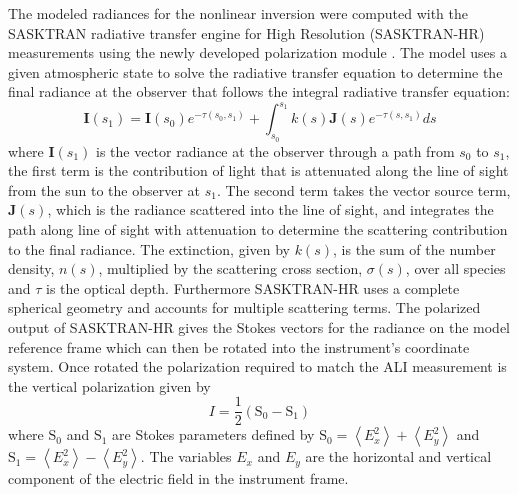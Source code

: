\documentclass[12pt]{article}
\begin{document}
The modeled radiances for the nonlinear inversion were computed with the SASKTRAN radiative transfer engine \citep{Bourassa2008a} for High Resolution (SASKTRAN-HR) 
\citep{Zawada2015} measurements using the newly developed polarization module \citep{Dueck2015}. The model uses a given atmospheric state to solve the radiative transfer 
equation to determine the final radiance at the observer that follows the integral radiative transfer equation:
\begin{equation}
    \mathbf{I}(s_{1}) = \mathbf{I}(s_{0})e^{-\tau(s_{0}, s_{1})}+\int^{s_{1}}_{s_{0}}k(s)\mathbf{J}(s)e^{-\tau(s, s_{1})}ds
\end{equation}
where $\mathbf{I}(s_{1})$ is the vector radiance at the observer through a path from $s_{0}$ to $s_{1}$, the first term is the contribution of light that is attenuated along the 
line of sight from the sun to the observer at $s_{1}$. The second term takes the vector source term, $\mathbf{J}(s)$, which is the radiance scattered into the line of sight, and 
integrates the path along line of sight with attenuation to determine the scattering contribution to the final radiance. The extinction, given by $k(s)$, is the sum of the 
number density, $n(s)$, multiplied by the scattering cross section, $\sigma(s)$, over all species and $\tau$ is the optical depth. Furthermore SASKTRAN-HR uses a complete 
spherical geometry and accounts for multiple scattering terms. The polarized output of SASKTRAN-HR gives the Stokes vectors for the radiance on the model reference frame which 
can then be rotated into the instrument's coordinate system. Once rotated the polarization required to match the ALI measurement is the vertical polarization given by
\begin{equation}
    I = \frac{1}{2}\left(\mathrm{S_{0}}-\mathrm{S_{1}}\right)
\end{equation}
where $\mathrm{S_{0}}$ and $\mathrm{S_{1}}$ are Stokes parameters defined by $\mathrm{S_{0}} = \left<E_{x}^{2}\right> + \left<E_{y}^{2}\right>$ and $\mathrm{S_{1}} = 
\left<E_{x}^{2}\right> - \left<E_{y}^{2}\right>$. The variables $E_{x}$ and $E_{y}$ are the horizontal and vertical component of the electric field in the instrument frame.
\end{document}
